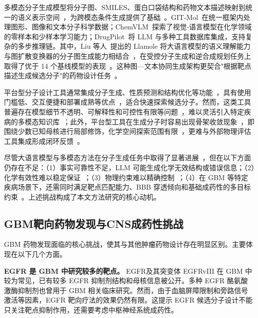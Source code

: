 多模态分子生成模型将分子图、SMILES、蛋白口袋结构和药物文本描述映射到统一的语义表示空间~\cite{Liu2024GITMol,Li2025ChemVLM}，为跨模态条件生成提供了基础~\cite{Liu2024GITMol,Li2025ChemVLM}。GIT-Mol~\cite{Liu2024GITMol}在统一框架内处理图形、图像和文本分子科学数据；ChemVLM~\cite{Li2025ChemVLM}探索了视觉-语言模型在化学领域的零样本和少样本学习能力；DrugPilot~\cite{Li2025DrugPilot}将 LLM 与多种工具数据库集成，支持复杂的多步推理链。其中，Liu 等人~\cite{liu2025multimodal}提出的 Llamole 将大语言模型的语义理解能力与图扩散变换器的分子图生成能力相结合~\cite{liu2025multimodal}，在受控分子生成和逆合成规划任务上取得了优于 14 个基线模型的表现~\cite{liu2025multimodal}。这种图—文本协同生成架构更契合"根据靶点描述生成候选分子"的药物设计任务~\cite{liu2025multimodal}。

平台型分子设计工具通常集成分子生成、性质预测和结构优化等功能~\cite{rusinko2024aiddison,torrensfontanals2024playmolecule}，具有使用门槛低、交互便捷和部署成熟等优点~\cite{rusinko2024aiddison,torrensfontanals2024playmolecule}，适合快速探索候选分子。然而，这类工具普遍存在模型细节不透明、可解释性和可控性有限等问题~\cite{wong2025explainable}，难以灵活引入特定疾病的多模态知识库~\cite{Li2025DrugPilot}；此外，平台型工具在生成分子时容易出现骨架收敛现象~\cite{Brown2019,varela2020skeledock}，即围绕少数已知母核进行局部修饰，化学空间探索范围有限~\cite{Brown2019}，更难与外部物理评估工具集成形成闭环反馈~\cite{Li2025DrugPilot}。

尽管大语言模型与多模态方法在分子生成任务中取得了显著进展~\cite{jin2025effective,Li2025DrugPilot}，但在以下方面仍存在不足：（1）事实可靠性不足，LLM 可能生成化学无效结构或错误信息；（2）化学有效性难以稳定保证~\cite{jin2025effective}；（3）物理约束难以精确控制~\cite{jin2025effective}；（4）在 GBM 等特定疾病场景下，还需同时满足靶点匹配能力、BBB 穿透倾向和基础成药性的多目标约束~\cite{Pardridge2012}。上述挑战构成了本文方法研究的核心动机。

\subsection{GBM靶向药物发现与CNS成药性挑战}\label{sec:gbm-drug-development}

GBM 药物发现面临的核心挑战，使其与其他肿瘤药物设计存在明显区别。主要体现在以下几个方面。

\textbf{EGFR 是 GBM 中研究较多的靶点。} EGFR及其突变体 EGFRvIII 在 GBM 中较为常见，已有较多 EGFR 抑制剂结构和母核信息被公开。多种 EGFR 酪氨酸激酶抑制剂也曾用于 GBM 相关临床研究。然而，由于血脑屏障限制和旁路信号激活等因素，EGFR 靶向疗法的效果仍然有限。这提示 EGFR 候选分子设计不能只关注靶点抑制作用，还需要考虑中枢神经系统成药性。

